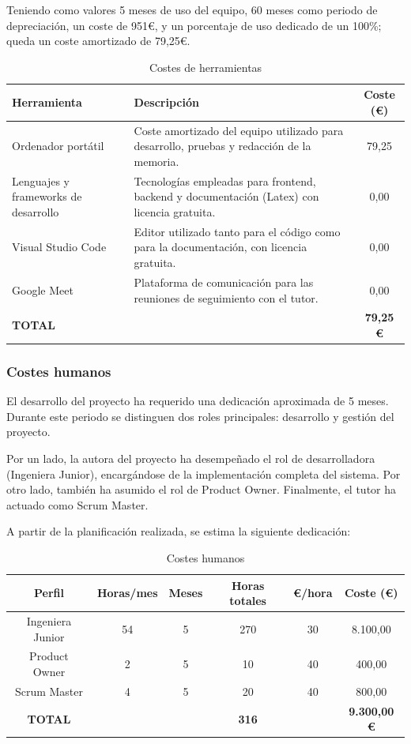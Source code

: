 Teniendo como valores 5 meses de uso del equipo, 60 meses como periodo de depreciación, un coste de 951€, y un porcentaje de uso dedicado de un 100\%; queda un coste amortizado de 79,25€.

\begin{table}[H]
\centering
\begin{tabular}{|p{4.5cm}|p{7.5cm}|c|}
\hline
\textbf{Herramienta} & \textbf{Descripción} & \textbf{Coste (€)} \\
\hline
Ordenador portátil & Coste amortizado del equipo utilizado para desarrollo, pruebas y redacción de la memoria. & 79,25 \\
\hline
Lenguajes y frameworks de desarrollo & Tecnologías empleadas para frontend, backend y documentación (Latex) con licencia gratuita. & 0,00 \\
\hline
Visual Studio Code & Editor utilizado tanto para el código como para la documentación, con licencia gratuita. & 0,00 \\
\hline
Google Meet & Plataforma de comunicación para las reuniones de seguimiento con el tutor. & 0,00 \\
\hline
\textbf{TOTAL} &  & \textbf{79,25 €} \\
\hline
\end{tabular}
\caption{Costes de herramientas}
\end{table}

\subsubsection{Costes humanos}

El desarrollo del proyecto ha requerido una dedicación aproximada de 5 meses. Durante este periodo se distinguen dos roles principales: desarrollo y gestión del proyecto.

Por un lado, la autora del proyecto ha desempeñado el rol de desarrolladora (Ingeniera Junior), encargándose de la implementación completa del sistema. Por otro lado, también ha asumido el rol de Product Owner. Finalmente, el tutor ha actuado como Scrum Master.

A partir de la planificación realizada, se estima la siguiente dedicación:

\begin{table}[H]
\centering
\begin{tabular}{|c|c|c|c|c|c|}
\hline
\textbf{Perfil} & \textbf{Horas/mes} & \textbf{Meses} & \textbf{Horas totales} & \textbf{€/hora} & \textbf{Coste (€)} \\
\hline
Ingeniera Junior & 54 & 5 & 270 & 30 & 8.100,00 \\
\hline
Product Owner & 2 & 5 & 10 & 40 & 400,00 \\
\hline
Scrum Master & 4 & 5 & 20 & 40 & 800,00 \\
\hline
\textbf{TOTAL} &  &  & \textbf{316} &  & \textbf{9.300,00 €} \\
\hline
\end{tabular}
\caption{Costes humanos}
\end{table}

